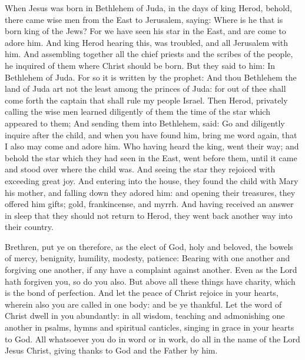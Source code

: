 When Jesus was born in Bethlehem of Juda, in the days of king Herod,
behold, there came wise men from the East to Jerusalem, saying: Where is he
that is born king of the Jews? For we have seen his star in the East, and are
come to adore him.  And king Herod hearing this, was troubled, and all
Jerusalem with him.  And assembling together all the chief priests and the
scribes of the people, he inquired of them where Christ should be born.  But
they said to him: In Bethlehem of Juda. For so it is written by the prophet:
And thou Bethlehem the land of Juda art not the least among the princes of
Juda: for out of thee shall come forth the captain that shall rule my people
Israel.  Then Herod, privately calling the wise men learned diligently of them
the time of the star which appeared to them; And sending them into Bethlehem,
said: Go and diligently inquire after the child, and when you have found him,
bring me word again, that I also may come and adore him.  Who having heard the
king, went their way; and behold the star which they had seen in the East, went
before them, until it came and stood over where the child was.  And seeing the
star they rejoiced with exceeding great joy.  And entering into the house, they
found the child with Mary his mother, and falling down they adored him: and
opening their treasures, they offered him gifts; gold, frankincense, and myrrh.
And having received an answer in sleep that they should not return to Herod,
they went back another way into their country.





Brethren, put ye on therefore, as the elect of God, holy and beloved, the bowels of
mercy, benignity, humility, modesty, patience: Bearing with one another and
forgiving one another, if any have a complaint against another. Even as the
Lord hath forgiven you, so do you also.  But above all these things have
charity, which is the bond of perfection.  And let the peace of Christ rejoice
in your hearts, wherein also you are called in one body: and be ye thankful.
Let the word of Christ dwell in you abundantly: in all wisdom, teaching and
admonishing one another in psalms, hymns and spiritual canticles, singing in
grace in your hearts to God.  All whatsoever you do in word or in work, do all
in the name of the Lord Jesus Christ, giving thanks to God and the Father by
him.



